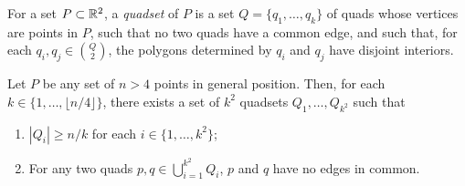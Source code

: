 \documentclass{patmorin}
\begin{document}
For a set $P\subset\mathbb{R}^2$, a \emph{quadset} of $P$ is a set
$Q=\{q_1,\ldots,q_k\}$ of quads whose vertices are points in $P$,
such that no two quads have a common edge, and such that, for each
$q_i,q_j\in \binom{Q}{2}$, the polygons determined by $q_i$ and $q_j$
have disjoint interiors.

\begin{lem}
  Let $P$ be any set of $n>4$ points in general position.  Then, for
  each $k\in\{1,\ldots,\lfloor n/4\rfloor\}$, there exists a set of $k^2$
  quadsets $Q_1,\ldots,Q_{k^2}$ such that
  \begin{enumerate}
    \item $|Q_i| \ge n/k$ for each $i\in\{1,\ldots,k^2\}$;
    \item For any two quads $p,q\in \bigcup_{i=1}^{k^2} Q_i$, $p$ and $q$
      have no edges in common.
  \end{enumerate}
\end{lem}
\end{document}
